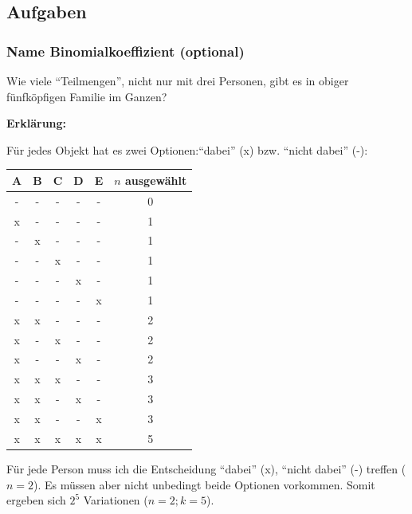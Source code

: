 \subsection*{Aufgaben}



  \newpage
  
\subsubsection{Name Binomialkoeffizient (optional)}

 Wie viele ``Teilmengen'', nicht nur mit drei Personen, gibt es in obiger
  fünfköpfigen Familie im Ganzen?

    

\textbf{Erklärung:}

Für jedes Objekt hat es zwei Optionen:``dabei'' (x) bzw. ``nicht dabei'' (-):

\begin{tabular}{ccccc|c}
A&B&C&D&E&$n$ ausgewählt \\\hline
-&-&-&-&-&0\\
x&-&-&-&-&1\\
-&x&-&-&-&1\\
-&-&x&-&-&1\\
-&-&-&x&-&1\\
-&-&-&-&x&1\\
x&x&-&-&-&2\\
x&-&x&-&-&2\\
x&-&-&x&-&2\\
\hline
\hline
x&x&x&-&-&3\\
x&x&-&x&-&3\\
x&x&-&-&x&3\\
\hline \hline
x&x&x&x&x&5\\\hline
\end{tabular}

Für jede Person muss ich die Entscheidung ``dabei'' (x), ``nicht dabei'' (-) treffen ($n=2$). Es müssen aber nicht unbedingt beide Optionen vorkommen. Somit ergeben sich $2^5$ Variationen ($n=2; k=5$).


